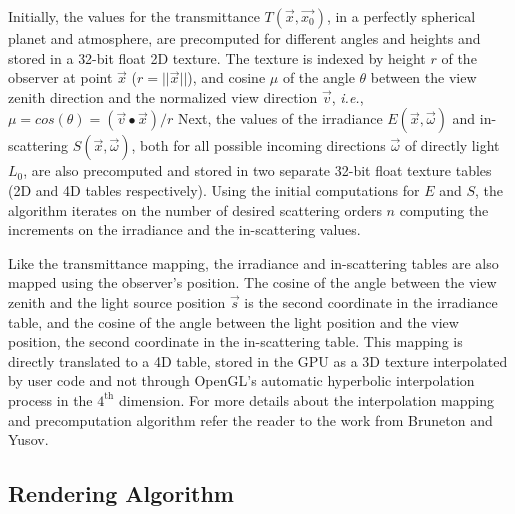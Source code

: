 \documentclass[journal]{vgtc}                %
\newcommand{\review}[1]{{\color{blue}#1}}
\begin{document}
Initially, the values for the transmittance $T(\vec{x}, \vec{x_0})$, in a perfectly spherical planet and atmosphere, are precomputed for different angles and heights and stored in a \review{32-bit} float \review{2D} texture. \review{The texture is indexed by height $r$ of the observer at point $\vec{x}$ ($r = ||\vec{x}||$), and cosine $\mu$ of the angle $\theta$ between the view zenith direction and the normalized view direction $\vec{v}$, \textit{i.e.}, $\mu = cos(\theta) = (\vec{v}\bullet\vec{x})/r$
} Next, the values of the irradiance $E(\vec{x}, \vec{\omega})$ and in-scattering $S(\vec{x}, \vec{\omega})$, both for all possible incoming directions $\vec{\omega}$ of directly light $L_0$, are also precomputed and stored in two \review{separate 32-bit} float texture tables (2D and 4D tables respectively). Using the initial computations for $E$ and $S$, the algorithm iterates on the number of desired scattering orders $n$ computing the increments on the irradiance and the in-scattering values.

\review{
Like the transmittance mapping, the irradiance and in-scattering tables are also mapped using the observer's position. The cosine of the angle between the view zenith and the light source position $\vec{s}$ %
is the second coordinate in the irradiance table, and the cosine of the angle between the light position and the view position, the second coordinate in the in-scattering table.
}
%
%
\review{This mapping is directly translated to a 4D table, stored in the GPU as a 3D texture interpolated by user code and not through OpenGL's automatic hyperbolic interpolation process in the $4^{\text{th}}$ dimension.}
%
For more details about the interpolation mapping and precomputation algorithm refer the reader to the work from Bruneton\cite{BrunetonNeyret:2008} and Yusov\cite{Yusov:2013}.

\vspace*{-1mm}
\subsection{Rendering Algorithm}
\end{document}

